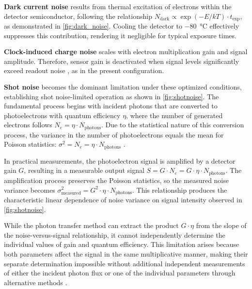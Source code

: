 \documentclass[
	parskip=half,
	a4paper,
]{scrarticle}
\begin{document}
\textbf{Dark current noise} results from thermal excitation of electrons within the detector semiconductor, following the relationship $N_\text{dark} \propto \exp(-E / kT) \cdot t_\text{exp}$, as demonstrated in \autoref{fig:dark_noise}. Cooling the detector to \SI{-80}{\degreeCelsius} effectively suppresses this contribution, rendering it negligible for typical exposure times.

\textbf{Clock-induced charge noise} scales with electron multiplication gain and signal amplitude. Therefore, sensor gain is deactivated when signal levels significantly exceed readout noise \cite{andor_establishing_nodate}, as in the present configuration.

\textbf{Shot noise} becomes the dominant limitation under these optimized conditions, establishing shot noise-limited operation as shown in \autoref{fig:shotnoise}. The fundamental process begins with incident photons that are converted to photoelectrons with quantum efficiency $\eta$, where the number of generated electrons follows $N_e = \eta \cdot N_{\text{photons}}$. Due to the statistical nature of this conversion process, the variance in the number of photoelectrons equals the mean for Poisson statistics: $\sigma^2 = N_e = \eta \cdot N_{\text{photons}}$ \cite{european_machine_vision_association_standard_2010}.

In practical measurements, the photoelectron signal is amplified by a detector gain $G$, resulting in a measurable output signal $S = G \cdot N_e = G \cdot \eta \cdot N_{\text{photons}}$. The amplification process preserves the Poisson statistics, so the measured noise variance becomes $\sigma^2_{\text{measured}} = G^2 \cdot \eta \cdot N_{\text{photons}}$. This relationship produces the characteristic linear dependence of noise variance on signal intensity observed in \autoref{fig:shotnoise}.

While the photon transfer method can extract the product $G \cdot \eta$ from the slope of the noise-versus-signal relationship, it cannot independently determine the individual values of gain and quantum efficiency. This limitation arises because both parameters affect the signal in the same multiplicative manner, making their separate determination impossible without additional independent measurements of either the incident photon flux or one of the individual parameters through alternative methods \cite{european_machine_vision_association_standard_2010}.
\end{document}
